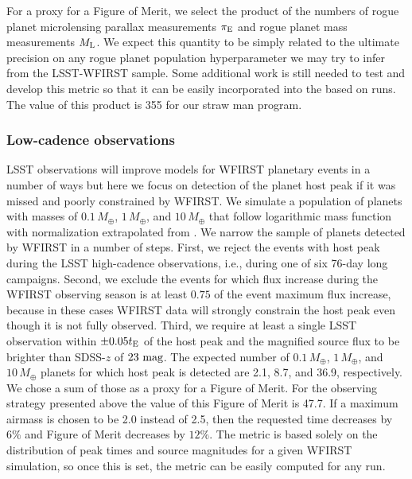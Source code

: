 For a proxy for a Figure of Merit, we select the product of the numbers of
rogue planet microlensing parallax measurements $\pi_{\rm E}$
and rogue planet mass measurements $M_{\rm L}$.
We expect this quantity to be simply related to the ultimate precision
on any rogue planet population hyperparameter we may try to infer from
the LSST-WFIRST sample.
Some additional
work is still needed to test and develop this metric so that it can be easily incorporated into the \MAF based on \OpSim runs.
The value of this product is 355 for our straw man program.


\subsubsection{Low-cadence observations}

LSST observations will improve models for WFIRST planetary events
in a number of ways but here we focus on detection of the planet
host peak if it was missed and poorly constrained by WFIRST. We simulate
a population of planets with masses of $0.1\,M_\oplus$, $1\,M_\oplus$,
and $10\,M_\oplus$ that follow logarithmic mass function with
normalization extrapolated from \citep{2012Natur.481..167C}. We narrow the sample of
planets detected by WFIRST in a number of steps. First, we reject the events
with host peak during the LSST high-cadence observations, i.e., during one of six
76-day long campaigns. Second, we exclude the events for which flux increase
during the WFIRST observing season is at least $0.75$ of the event maximum
flux increase, because in these cases WFIRST
data will strongly constrain the host peak even though it is not fully observed.
Third, we require at least a single LSST observation within $\pm0.05t_{\rm E}$ of
the host peak and the magnified source flux to be brighter than SDSS-$z$ of $23~{\rm mag}$.
The expected number of $0.1\,M_\oplus$, $1\,M_\oplus$, and $10\,M_\oplus$
planets for which host peak is detected are 2.1, 8.7, and 36.9, respectively.
We chose a sum of those as a proxy for a Figure of Merit. For the observing strategy
presented above the value of this Figure of Merit is 47.7. If a maximum airmass is chosen to be
2.0 instead of 2.5, then the requested time decreases by $6\%$ and Figure of Merit decreases by $12\%$.
The metric is based solely on the distribution of peak times and source magnitudes
for a given WFIRST simulation, so once this is set, the metric can
be easily computed for any \OpSim run.



